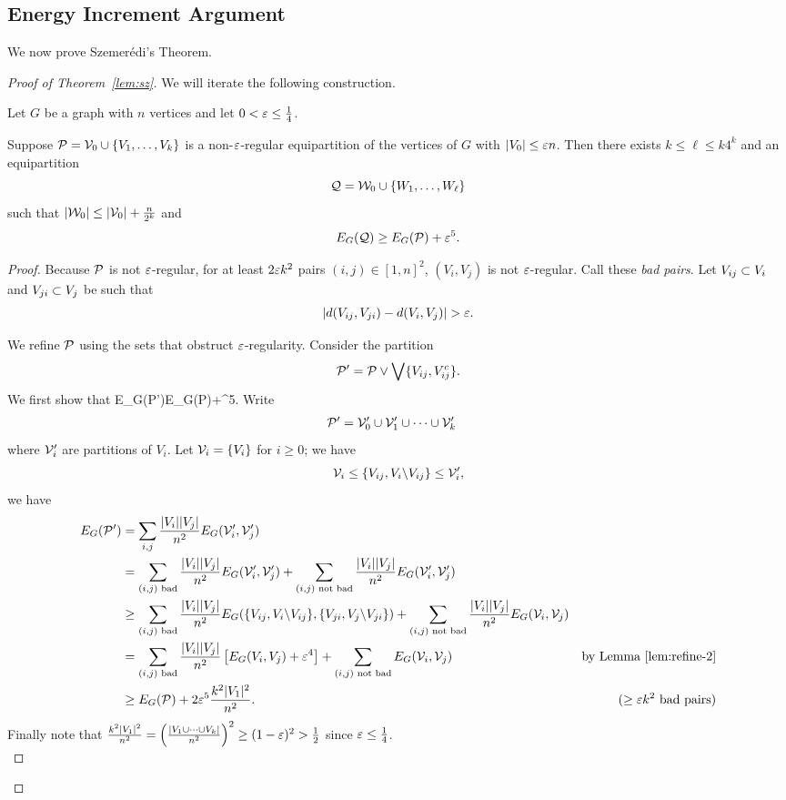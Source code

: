 \subsection{Energy Increment Argument}
We now prove Szemer\'edi's Theorem.
\begin{proof}[Proof of Theorem~\ref{lem:sz}]
We will iterate the following construction.
\begin{lem}
Let $G$ be a graph with $n$ vertices and let $0< \ep\le \rc4$.

Suppose $\cal P=\cal V_0\cup \{V_1,\ldots,V_k\}$ is a non-$\ep$-regular equipartition of the vertices of $G$ with $|V_0|\le \ep n$. Then there exists $k\le\ell\le k4^k$ and an equipartition
\[
\cal Q=\cal W_0\cup \{W_1,\ldots, W_{\ell}\}
\]
such that $|\cal W_0|\le |\cal V_0|+\fc{n}{2^k}$ and 
\[
E_G(\cal Q)\ge E_G(\cal P)+{\ep^5}.
\]
\end{lem}
\begin{proof}
Because $\cal P$ is not $\ep$-regular, for at least $2\ep k^2$ pairs $(i,j)\in [1,n]^2$, $(V_i,V_j)$ is not $\ep$-regular. Call these {\it bad pairs}. Let $V_{ij}\sub V_i$ and $V_{ji}\sub V_j$ be such that
\[
|d(V_{ij},V_{ji})-d(V_i,V_j)|>\ep.
\]

 We refine $\cal P$ using the sets that obstruct $\ep$-regularity. 
Consider the partition
\[
\cal P'=\cal P\vee\bigvee \{V_{ij},V_{ij}^c\}.
\]
We first show that 
E_G(\cal P')\ge E_G(\cal P)+\ep^5.
\eeq
Write 
\begin{align*}
\cal P'&=\cal V'_0\cup \cal V'_1\cup \cdots \cup\cal V'_k
\end{align*}
where $\cal V_i'$ are partitions of $V_i$. 
Let $\cal V_i=\{V_i\}$ for $i\ge 0$; we have
\[
\cal V_i\le \{V_{ij},V_i\bs V_{ij}\}\le \cal V_i',
\]
we have
\begin{align*}
E_G(\cal P')&=\sum_{i,j} \fc{|V_i||V_j|}{n^2}E_G(\cal V_i',\cal V_j')\\
&=\sum_{(i,j)\text{ bad}}\fc{|V_i||V_j|}{n^2}E_G(\cal V_i',\cal V_j')
+\sum_{(i,j)\text{ not bad}}\fc{|V_i||V_j|}{n^2}E_G(\cal V_i',\cal V_j')\\
&\ge \sum_{(i,j)\text{ bad}}\fc{|V_i||V_j|}{n^2} E_G(\{V_{ij},V_i\bs V_{ij}\},\{V_{ji},V_j\bs V_{ji}\})
+\sum_{(i,j)\text{ not bad}}\fc{|V_i||V_j|}{n^2}E_G(\cal V_i, \cal V_j)\\
&= \sum_{(i,j)\text{ bad}}\fc{|V_i||V_j|}{n^2}\ba{E_G(V_i,V_j)+\ep^4
}+\sum_{(i,j)\text{ not bad}}E_G( \cal V_i,\cal V_j)&\text{by Lemma~\ref{lem:refine-2}}\\
&\ge E_G(\cal P)+2\ep^5\fc{k^2|V_1|^2}{n^2}.&(\ge \ep k^2\text{ bad pairs})
\end{align*}
Finally note that $\fc{k^2|V_1|^2}{n^2}=\pf{|V_1\cup \cdots \cup V_k|}{n^2}^2\ge (1-\ep)^2>\rc2$ since $\ep\le\rc 4$.\\


\end{proof}
\end{proof}
